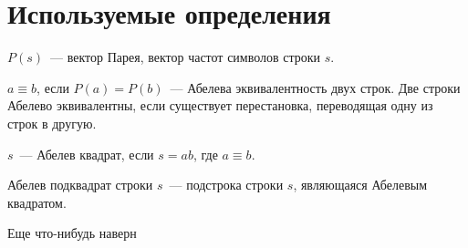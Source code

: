 \section{Используемые определения}

\begin{definition}
$P(s)$~--- вектор Парея, вектор частот символов строки $s$.
\end{definition}

\begin{definition}
$a \equiv b$, если $P(a) = P(b)$~--- Абелева эквивалентность двух строк. Две строки Абелево эквивалентны, если существует перестановка, переводящая одну из строк в другую.
\end{definition}

\begin{definition}
$s$~--- Абелев квадрат, если $s=ab$, где $a \equiv b$.
\end{definition}

\begin{definition}
Абелев подквадрат строки $s$~--- подстрока строки $s$, являющаяся Абелевым квадратом.
\end{definition}





Еще что-нибудь наверн